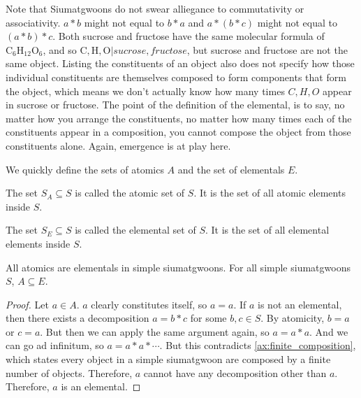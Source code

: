Note that Siumatgwoons do not swear alliegance to commutativity or associativity. $a*b$ might not equal to $b*a$ and $a*(b*c)$ might not equal to $(a*b)*c$. Both sucrose and fructose have the same molecular formula of $\text{C}_6\text{H}_{12}\text{O}_6$, and so $\text{C}, \text{H}, \text{O} | sucrose, fructose$, but sucrose and fructose are not the same object. Listing the constituents of an object also does not specify how those individual constituents are themselves composed to form components that form the object, which means we don't actually know how many times $C, H, O$ appear in sucrose or fructose. The point of the definition of the elemental, is to say, no matter how you arrange the constituents, no matter how many times each of the constituents appear in a composition, you cannot compose the object from those constituents alone. Again, emergence is at play here.



We quickly define the sets of atomics $A$ and the set of elementals $E$.

\begin{definition}\label{def:atomic-set}
    The set $S_A \subseteq S$ is called the atomic set of $S$. It is the set of all atomic elements inside $S$.
\end{definition}

\begin{definition}\label{def:elemental-set}
    The set $S_E \subseteq S$ is called the elemental set of $S$. It is the set of all elemental elements inside $S$.
\end{definition}


\begin{lemma}\label{def:atomics-are-elementals-in-simple-siumatgwoons}
    All atomics are elementals in simple siumatgwoons. For all simple siumatgwoons $S$, $A \subseteq E$.
\end{lemma}
\begin{proof}
    Let $a \in A$. $a$ clearly constitutes itself, so $a=a$. If $a$ is not an elemental, then there exists a decomposition $a=b*c$ for some $b,c \in S$. By atomicity, $b=a$ or $c=a$. But then we can apply the same argument again, so $a=a*a$. And we can go ad infinitum, so $a=a*a*\cdots$. But this contradicts \ref{ax:finite_composition}, which states every object in a simple siumatgwoon are composed by a finite number of objects. Therefore, $a$ cannot have any decomposition other than $a$. Therefore, $a$ is an elemental.
\end{proof}


